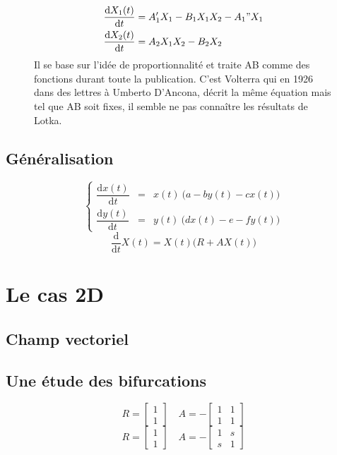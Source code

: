 \documentclass{wsdcr}
\begin{document}
\begin{figure}[b!]
{\begin{minipage}{.95\linewidth}
\begin{equation}
\begin{aligned}
{\dfrac {\mathrm {d} X_1(t)}{\mathrm {d} t}}&=A_1'X_1-B_1X_1X_2-A_1"X_1\\
{\dfrac {\mathrm {d} X_2(t)}{\mathrm {d} t}}&=A_2X_1X_2-B_2X_2
\end{aligned}
\end{equation}
Il se base sur l'idée de proportionnalité et traite AB comme des fonctions durant toute la publication. C'est Volterra qui en 1926 dans des lettres à Umberto D'Ancona, décrit la même équation mais tel que AB soit fixes, il semble ne pas connaître les résultats de Lotka.
\end{minipage}
}
\end{figure}
\subsection{Généralisation}
\begin{equation}
\left\{
{\begin{array}{ccc}{\dfrac {\mathrm {d} x(t)}{\mathrm {d} t}}&=&x(t)\ {\Big (}a -b y(t)-c x(t){\Big )}\\{\dfrac {\mathrm {d} y(t)}{\mathrm {d} t}}&=&y(t)\ {\Big (}d x(t)-e -f y(t) {\Big )}\end{array}}
\right.
\end{equation}
\begin{equation}
\dfrac {\mathrm {d}}{\mathrm {d} t}X(t)=X(t) {\Big (}R+AX(t){\Big )}
\end{equation}
\section{Le cas 2D}
\subsection{Champ vectoriel}
\subsection{Une étude des bifurcations}
\begin{equation}
R={\begin{bmatrix}1\\1\end{bmatrix}}\quad A =-{\begin{bmatrix}1&1\\1&1\end{bmatrix}}
\end{equation}
\begin{equation}
R={\begin{bmatrix}1\\1\end{bmatrix}}\quad A =-{\begin{bmatrix}1&s\\s&1\end{bmatrix}}
\end{equation}
\end{document}
